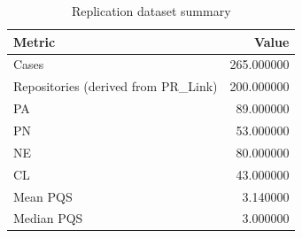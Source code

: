\begin{table}
\caption{Replication dataset summary}
\label{tab:replication-summary}
\begin{tabular}{lr}
\toprule
Metric & Value \\
\midrule
Cases & 265.000000 \\
Repositories (derived from PR_Link) & 200.000000 \\
PA & 89.000000 \\
PN & 53.000000 \\
NE & 80.000000 \\
CL & 43.000000 \\
Mean PQS & 3.140000 \\
Median PQS & 3.000000 \\
\bottomrule
\end{tabular}
\end{table}
